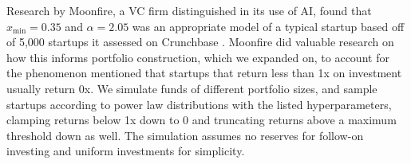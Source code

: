 \documentclass[a4paper, oneside]{discothesis}
\begin{document}
\pagebreak

Research by Moonfire, a VC firm distinguished in its use of AI, found that $x_{\text{min}} = 0.35$ and $\alpha = 2.05$ was an appropriate model of a typical 
startup based off of 5,000 startups it assessed on Crunchbase \cite{farina_arpaia_2023_venture_capital_portfolio_construction}. Moonfire did valuable research on how this informs portfolio construction, which we expanded on, to account for the phenomenon mentioned that startups that return less than 1x on investment usually return 0x. We simulate funds of different portfolio sizes, and sample startups according to power law distributions with the listed hyperparameters, clamping returns below 1x down to 0 and truncating returns above a maximum threshold down as well. The simulation assumes no reserves for follow-on investing and uniform investments for simplicity.
\end{document}
